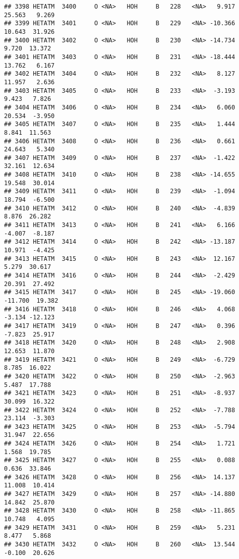 \documentclass[
]{article}
\begin{document}
\begin{verbatim}
## 3398 HETATM  3400     O <NA>   HOH     B   228   <NA>   9.917  25.563   9.269
## 3399 HETATM  3401     O <NA>   HOH     B   229   <NA> -10.366  10.643  31.926
## 3400 HETATM  3402     O <NA>   HOH     B   230   <NA> -14.734   9.720  13.372
## 3401 HETATM  3403     O <NA>   HOH     B   231   <NA> -18.444  13.762   6.167
## 3402 HETATM  3404     O <NA>   HOH     B   232   <NA>   8.127  11.957   2.636
## 3403 HETATM  3405     O <NA>   HOH     B   233   <NA>  -3.193   9.423   7.826
## 3404 HETATM  3406     O <NA>   HOH     B   234   <NA>   6.060  20.534  -3.950
## 3405 HETATM  3407     O <NA>   HOH     B   235   <NA>   1.444   8.841  11.563
## 3406 HETATM  3408     O <NA>   HOH     B   236   <NA>   0.661  24.643   5.340
## 3407 HETATM  3409     O <NA>   HOH     B   237   <NA>  -1.422  32.161  12.634
## 3408 HETATM  3410     O <NA>   HOH     B   238   <NA> -14.655  19.548  30.014
## 3409 HETATM  3411     O <NA>   HOH     B   239   <NA>  -1.094  18.794  -6.500
## 3410 HETATM  3412     O <NA>   HOH     B   240   <NA>  -4.839   8.876  26.282
## 3411 HETATM  3413     O <NA>   HOH     B   241   <NA>   6.166  -4.007  -8.187
## 3412 HETATM  3414     O <NA>   HOH     B   242   <NA> -13.187  10.971  -4.425
## 3413 HETATM  3415     O <NA>   HOH     B   243   <NA>  12.167   5.279  30.617
## 3414 HETATM  3416     O <NA>   HOH     B   244   <NA>  -2.429  20.391  27.492
## 3415 HETATM  3417     O <NA>   HOH     B   245   <NA> -19.060 -11.700  19.382
## 3416 HETATM  3418     O <NA>   HOH     B   246   <NA>   4.068  -3.134 -12.123
## 3417 HETATM  3419     O <NA>   HOH     B   247   <NA>   0.396  -7.823  25.917
## 3418 HETATM  3420     O <NA>   HOH     B   248   <NA>   2.908  12.653  11.870
## 3419 HETATM  3421     O <NA>   HOH     B   249   <NA>  -6.729   8.785  16.022
## 3420 HETATM  3422     O <NA>   HOH     B   250   <NA>  -2.963   5.487  17.788
## 3421 HETATM  3423     O <NA>   HOH     B   251   <NA>  -8.937  30.099  16.322
## 3422 HETATM  3424     O <NA>   HOH     B   252   <NA>  -7.788  23.114  -3.303
## 3423 HETATM  3425     O <NA>   HOH     B   253   <NA>  -5.794  31.947  22.656
## 3424 HETATM  3426     O <NA>   HOH     B   254   <NA>   1.721   1.568  19.785
## 3425 HETATM  3427     O <NA>   HOH     B   255   <NA>   0.088   0.636  33.846
## 3426 HETATM  3428     O <NA>   HOH     B   256   <NA>  14.137  11.008  10.414
## 3427 HETATM  3429     O <NA>   HOH     B   257   <NA> -14.880  14.842  25.870
## 3428 HETATM  3430     O <NA>   HOH     B   258   <NA> -11.865  10.748   4.095
## 3429 HETATM  3431     O <NA>   HOH     B   259   <NA>   5.231   8.477   5.868
## 3430 HETATM  3432     O <NA>   HOH     B   260   <NA>  13.544  -0.100  20.626

\end{verbatim}
\end{document}

